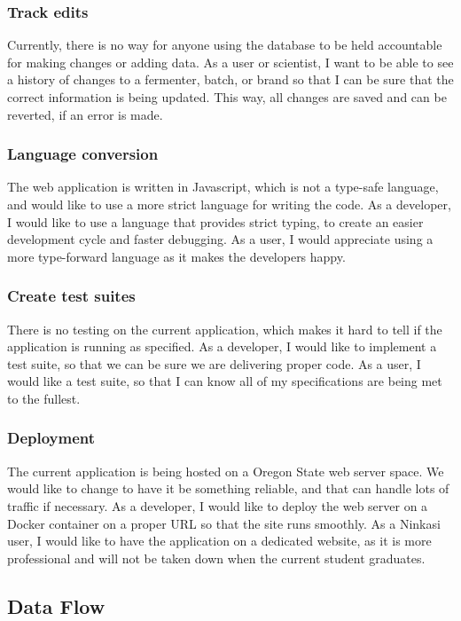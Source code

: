         \subsubsection{Track edits}
            Currently, there is no way for anyone using the database to be held accountable for making changes or adding data. As a user or scientist, I want to be able to see a history of changes to a fermenter, batch, or brand so that I can be sure that the correct information is being updated. This way, all changes are saved and can be reverted, if an error is made. 
        \subsubsection{Language conversion}
            The web application is written in Javascript, which is not a type-safe language, and would like to use a more strict language for writing the code.
            As a developer, I would like to use a language that provides strict typing, to create an easier development cycle and faster debugging. As a user, I would appreciate using a more type-forward language as it makes the developers happy.
        \subsubsection{Create test suites}
            There is no testing on the current application, which makes it hard to tell if the application is running as specified. As a developer, I would like to implement a test suite, so that we can be sure we are delivering proper code. As a user, I would like a test suite, so that I can know all of my specifications are being met to the fullest. 
        \subsubsection{Deployment}
            The current application is being hosted on a Oregon State web server space. We would like to change to have it be something reliable, and that can handle lots of traffic if necessary. As a developer, I would like to deploy the web server on a Docker container on a proper URL so that the site runs smoothly. As a Ninkasi user, I would like to have the application on a dedicated website, as it is more professional and will not be taken down when the current student graduates.        
    \subsection{Data Flow}
